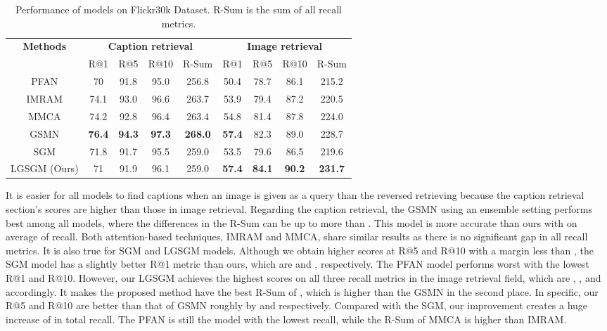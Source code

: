 \documentclass{IOS-Book-Article}
\begin{document}
\begin{table*}[ht!]
  \caption{Performance of models on Flickr30k Dataset. R-Sum is the sum of all recall metrics.}
  \label{tab:flickr30k}
  \begin{tabular}{|c|c|c|c|c|c|c|c|c|}
    \hline
    \multirow{2}{*}{\textbf{Methods}} & \multicolumn{4}{|c|}{\textbf{Caption retrieval}} & \multicolumn{4}{|c|}{\textbf{Image retrieval}}\\
    \cline{2-9}
    & R@1 & R@5 & R@10 & R-Sum & R@1 & R@5 & R@10 & R-Sum\\
    \hline
    PFAN \cite{wang2019position} & 70 & 91.8 & 95.0 & 256.8 & 50.4 & 78.7 & 86.1 & 215.2 \\
    \hline
    IMRAM \cite{chen2020imram} & 74.1 & 93.0 & 96.6 & 263.7 & 53.9 & 79.4 & 87.2 & 220.5 \\
    \hline
    MMCA \cite{wei2020multi} & 74.2 & 92.8 & 96.4 & 263.4 & 54.8 & 81.4 & 87.8 & 224.0 \\
    \hline
    GSMN \cite{liu2020graph} & \textbf{76.4} & \textbf{94.3} & \textbf{97.3} & \textbf{268.0} & \textbf{57.4} & 82.3 & 89.0 & 228.7\\
    \hline
    SGM \cite{wang2020cross} & 71.8 & 91.7 & 95.5 & 259.0 & 53.5 & 79.6 & 86.5 & 219.6\\
    \hline
    LGSGM (Ours) & 71 & 91.9 & 96.1 & 259.0 & \textbf{57.4} & \textbf{84.1} & \textbf{90.2} & \textbf{231.7}\\
    \hline
\end{tabular}
\end{table*}

It is easier for all models to find captions when an image is given as a query than the reversed retrieving because the caption retrieval section's scores are higher than those in image retrieval. Regarding the caption retrieval, the GSMN using an ensemble setting performs best among all models, where the differences in the R-Sum can be up to more than . This model is more accurate than ours with  on average of recall. Both attention-based techniques, IMRAM and MMCA, share similar results as there is no significant gap in all recall metrics. It is also true for SGM and LGSGM models. Although we obtain higher scores at R@5 and R@10 with a margin less than , the SGM model has a slightly better R@1 metric than ours, which are  and , respectively. The PFAN model performs worst with the lowest R@1 and R@10. However, our LGSGM achieves the highest scores on all three recall metrics in the image retrieval field, which are , , and  accordingly. It makes the proposed method have the best R-Sum of , which is  higher than the GSMN in the second place. In specific, our R@5 and R@10 are better than that of GSMN roughly by  and  respectively. Compared with the SGM, our improvement creates a huge increase of  in total recall. The PFAN is still the model with the lowest recall, while the R-Sum of MMCA is  higher than IMRAM.
\end{document}
